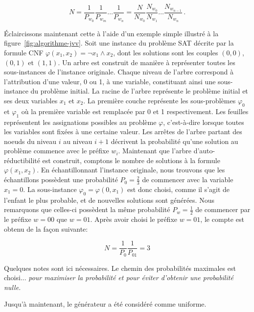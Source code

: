 \begin{equation}
    N = \frac{1}{P_{w_{0}}} \frac{1}{P_{w_{m}}} \dots \frac{1}{P_{w_{n}}} = \frac{N}{N_{w_{0}}} \frac{N_{w_{0}}}{N_{w_{1}}} \dots \frac{N_{w_{n-1}}}{N_{w_{n}}} \,.
\end{equation}

Éclaircissons maintenant cette à l'aide d'un exemple simple illustré à la figure~\ref{fig:algorithme-jvv}. Soit une instance du problème SAT décrite par la formule CNF $\varphi(x_{1}, x_{2}) = \neg x_{1} \land x_{2}$, dont les solutions sont les couples $(0,0)$, $(0,1)$ et $(1,1)$. Un arbre est construit de manière à représenter toutes les sous-instances de l'instance originale. Chaque niveau de l'arbre correspond à l'attribution d'une valeur, 0 ou 1, à une variable, constituant ainsi une sous-instance du problème initial. La racine de l'arbre représente le problème initial et ses deux variables $x_{1}$ et $x_{2}$. La première couche représente les sous-problèmes $\varphi_{0}$ et $\varphi_{1}$ où la première variable est remplacée par 0 et 1 respectivement. Les feuilles représentent les assignations possibles au problème $\varphi$, c'est-à-dire lorsque toutes les variables sont fixées à une certaine valeur. Les arrêtes de l'arbre partant des noeuds du niveau $i$ au niveau $i+1$ décrivent la probabilité qu'une solution au problème commence avec le préfixe $w_{i}$. Maintenant que l'arbre d'auto-réductibilité est construit, comptons le nombre de solutions à la formule $\varphi(x_{1}, x_{2})$. En échantillonnant l'instance originale, nous trouvons que les échantillons possèdent une probabilité $P_{0}=\frac{2}{3}$ de commencer avec la variable $x_{1} = 0$. La sous-instance $\varphi_{0} = \varphi(0, x_{1})$ est donc choisi, comme il s'agit de l'enfant le plus probable, et de nouvelles solutions sont générées. Nous remarquons que celles-ci possèdent la même probabilité $P_{w}=\frac{1}{2}$ de commencer par le préfixe $w=00$ que $w=01$. Après avoir choisi le préfixe $w=01$, le compte est obtenu de la façon suivante:

\begin{equation}
   N = \frac{1}{P_{0}} \frac{1}{P_{01}} = 3
\end{equation}
  

Quelques notes sont ici nécessaires. Le chemin des probabilités maximales est choisi... \textcolor{mydarkred}{\textit{pour maximiser la probabilité et pour éviter d'obtenir une probabilité nulle.}}


Jusqu'à maintenant, le générateur a été considéré comme uniforme. 

